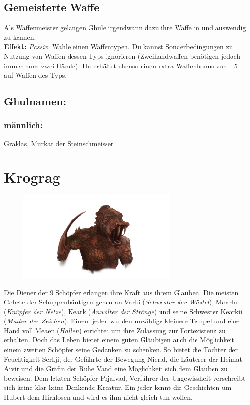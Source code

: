 \subsection*{Gemeisterte Waffe} \label{sk:gemeistertewaffe}
Als Waffenmeister gelangen Ghule irgendwann dazu ihre Waffe in und auswendig zu kennen.  \\
\textbf{Effekt:} \textit{Passiv.} Wahle einen Waffentypen. Du kannst Sonderbedingungen zu Nutzung von Waffen dessen Typs ignorieren (Zweihandwaffen benötigen jedoch immer noch zwei Hände). Du erhältst ebenso einen extra Waffenbonus von +5 auf Waffen des Typs.  

\subsection*{Ghulnamen:}

\subsubsection*{männlich:}
Graklas, Murkat der Steinschmeisser


\clearpage

\section{Krograg} \label{art:krograg}

\begin{figure}[htbp]
        \centering
		\includegraphics[width=8cm]{Pictures/Krograd.png}
        \label{fig:Krograg}
\end{figure}

Die Diener der 9 Schöpfer erlangen ihre Kraft aus ihrem Glauben. Die meisten Gebete der Schuppenhäutigen gehen an Varki (\textit{Schwester der Wüstel}), Moarln (\textit{Knüpfer der Netze}), Keark (\textit{Anwälter der Stränge}) und seine Schwester Kearkii (\textit{Mutter der Zeichen}). Einem jeden wurden unzählige kleinere Tempel und eine Hand voll Meaen (\textit{Hallen}) errichtet um ihre Zulassung zur Fortexistenz zu erhalten. Doch das Leben bietet einem guten Gläubigen auch die Möglichkeit einem zweiten Schöpfer seine Gedanken zu schenken. So bietet die Tochter der Feuchtigkeit Serkji, der Gefährte der Bewegung Nierld, die Läuterer der Heimat Aivir und die Gräfin der Ruhe Vand eine Möglichkeit sich dem Glauben zu beweisen. Dem letzten Schöpfer Prjalvad, Verführer der Ungewissheit verschreibt sich keine klar keine Denkende Kreatur. Ein jeder kennt die Geschichten um Hubert dem Hirnlosen und wird es ihm nicht gleich tun wollen.

